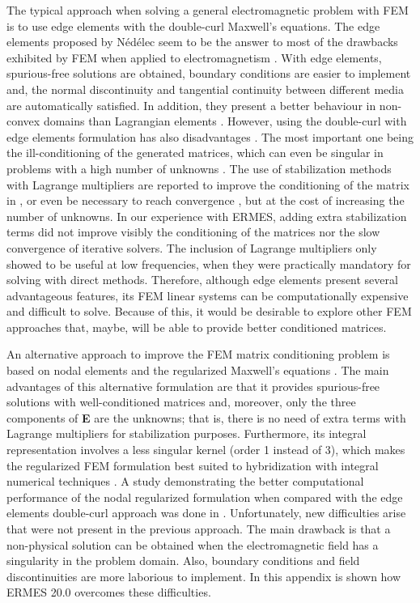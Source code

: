 The typical approach when solving a general electromagnetic problem with FEM is to use edge elements with the double-curl Maxwell's equations. The edge elements proposed by N\'{e}d\'{e}lec \cite{Nedelec} seem to be the answer to most of the drawbacks exhibited by FEM when applied to electromagnetism \cite{Jin, LuisGarcia}. With edge elements, spurious-free solutions are obtained, boundary conditions are easier to implement and, the normal discontinuity and tangential continuity between different media are automatically satisfied. In addition, they present a better behaviour in non-convex domains than Lagrangian elements \cite{EdgeElementsPuntiagudo}. However, using the double-curl with edge elements formulation has also disadvantages \cite{EdgeElementsFallacy, EdgeElementsProsNo}. The most important one being the ill-conditioning of the generated matrices, which can even be singular in problems with a high number of unknowns \cite{SingularEE}. The use of stabilization methods with Lagrange multipliers are reported to improve the conditioning of the matrix in \cite{AugmentedFormulations, HiptmairReport}, or even be necessary to reach convergence \cite{Kikuchi, Ledger-hp}, but at the cost of increasing the number of unknowns. In our experience with ERMES, adding extra stabilization terms did not improve visibly the conditioning of the matrices nor the slow convergence of iterative solvers. The inclusion of Lagrange multipliers only showed to be useful at low frequencies, when they were practically mandatory for solving with direct methods. Therefore, although edge elements present several advantageous features, its FEM linear systems can be computationally expensive and difficult to solve. Because of this, it would be desirable to explore other FEM approaches that, maybe, will be able to provide better conditioned matrices.

An alternative approach to improve the FEM matrix conditioning problem is based on nodal elements and the regularized Maxwell's equations \cite{BC-OJOOut, WeightedRegularizedME}. The main advantages of this alternative formulation are that it provides spurious-free solutions with well-conditioned matrices and, moreover, only the three components of \textbf{E} are the unknowns; that is, there is no need of extra terms with Lagrange multipliers for stabilization purposes. Furthermore, its integral representation involves a less singular kernel (order 1 instead of 3), which makes the regularized FEM formulation best suited to hybridization with integral numerical techniques \cite{BC-OJOOut}. A study demonstrating the better computational performance of the nodal regularized formulation when compared with the edge elements double-curl approach was done in \cite{WRME-Performance}. Unfortunately, new difficulties arise that were not present in the previous approach. The main drawback is that a non-physical solution can be obtained when the electromagnetic field has a singularity in the problem domain. Also, boundary conditions and field discontinuities are more laborious to implement. In this appendix is shown how ERMES 20.0 overcomes these difficulties.

